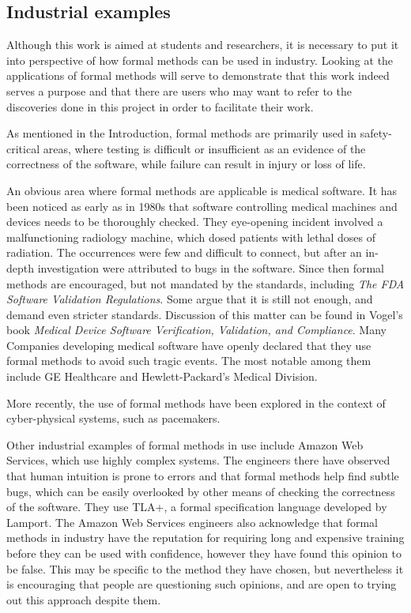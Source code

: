 \documentclass[11pt,journal]{IEEEtran}
\begin{document}
	\subsection{Industrial examples}
	Although this work is aimed at students and researchers, it is necessary to put it into perspective of how formal methods can be used in industry. Looking at the applications of formal methods will serve to demonstrate that this work indeed serves a purpose and that there are users who may want to refer to the discoveries done in this project in order to facilitate their work.
	
	As mentioned in the Introduction, formal methods are primarily used in safety-critical areas, where testing is difficult or insufficient as an evidence of the correctness of the software, while failure can result in injury or loss of life. 
	
	An obvious area where formal methods are applicable is medical software. It has been noticed as early as in 1980s that software controlling medical machines and devices needs to be thoroughly checked. They eye-opening incident involved a malfunctioning radiology machine, which dosed patients with lethal doses of radiation. The occurrences were few and difficult to connect, but after an in-depth investigation were attributed to bugs in the software.\cite{therac} Since then formal methods are encouraged, but not mandated by the standards, including \emph{The FDA Software Validation Regulations}\cite{FDA}. Some argue that it is still not enough, and demand even stricter standards. Discussion of this matter can be found in Vogel's book \emph{Medical Device Software Verification, Validation, and Compliance}\cite{vogel}. Many Companies developing medical software have openly declared that they use formal methods to avoid such tragic events. The most notable among them include GE Healthcare\cite{ge} and Hewlett-Packard's Medical Division\cite{hp}.
	
	More recently, the use of formal methods have been explored in the context of cyber-physical systems, such as pacemakers. \cite{pacemaker_kwiatkowska1} \cite{pacemaker_kwiatkowska2} \cite{pacemaker_kwiatkowska3}
	
	Other industrial examples of formal methods in use include Amazon Web Services, which use highly complex systems.\cite{amazon} The engineers there have observed that human intuition is prone to errors and that formal methods help find subtle bugs, which can be easily overlooked by other means of checking the correctness of the software. They use TLA+, a formal specification language developed by Lamport\cite{TLA}. The Amazon Web Services engineers also acknowledge that formal methods in industry have the reputation for requiring long and expensive training before they can be used with confidence, however they have found this opinion to be false. This may be specific to the method they have chosen, but nevertheless it is encouraging that people are questioning such opinions, and are open to trying out this approach despite them.
		
\end{document}
